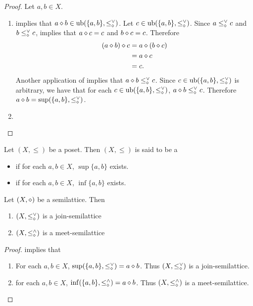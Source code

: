 \documentclass{book}
\begin{document}
	\begin{proof} 
		Let $a,b \in X$.
		\begin{enumerate}
			\item 
			 implies that $a \diamond b \in \operatorname{ub}( \{a,b\}, \leq_{\diamond}^{\vee})$. Let $c \in \operatorname{ub}( \{a,b\}, \leq_{\diamond}^{\vee})$. Since $a \leq_{\diamond}^{\vee} c$ and $b \leq_{\diamond}^{\vee} c$,  implies that $a \diamond c = c$ and $b \diamond c = c$. Therefore 
			\begin{align*}
				(a \diamond b) \diamond c 
				& = a \diamond (b \diamond c) \\
				& = a \diamond c \\
				& = c.
			\end{align*}
			Another application of  implies that $a \diamond b \leq_{\diamond}^{\vee} c$. Since $c \in \operatorname{ub}( \{a,b\}, \leq_{\diamond}^{\vee})$ is arbitrary, we have that for each $c \in \operatorname{ub}( \{a,b\}, \leq_{\diamond}^{\vee})$, $a \diamond b \leq_{\diamond}^{\vee} c$. Therefore $a \diamond b = \sup( \{a,b\}, \leq_{\diamond}^{\vee})$.
			\item {}
		\end{enumerate}
	\end{proof}
	
	\begin{defn} 
		Let $(X, \leq)$ be a poset. Then $(X, \leq)$ is said to be a
		\begin{itemize}
			\item {} if for each $a,b \in X$, $\sup \{a,b\}$ exists. 
			\item {} if for each $a,b \in X$, $\inf \{a,b\}$ exists. 
		\end{itemize}
	\end{defn}
	
	\begin{ex} 
		Let $(X, \diamond)$ be a semilattice. Then 
		\begin{enumerate}
			\item $(X, \leq_{\diamond}^{\vee})$ is a join-semilattice 
			\item $(X, \leq_{\diamond}^{\wedge})$ is a meet-semilattice
		\end{enumerate}
	\end{ex}
	
	\begin{proof}
		 implies that
		\begin{enumerate}
			\item For each $a,b \in X$, $\sup (\{a,b\}, \leq_{\diamond}^{\vee}) = a \diamond b$. Thus $(X, \leq_{\diamond}^{\vee})$ is a join-semilattice.
			\item for each $a,b \in X$, $\inf (\{a,b\}, \leq_{\diamond}^{\wedge}) = a \diamond b$. Thus $(X, \leq_{\diamond}^{\wedge})$ is a meet-semilattice.
		\end{enumerate}
	\end{proof}
	
\end{document}

